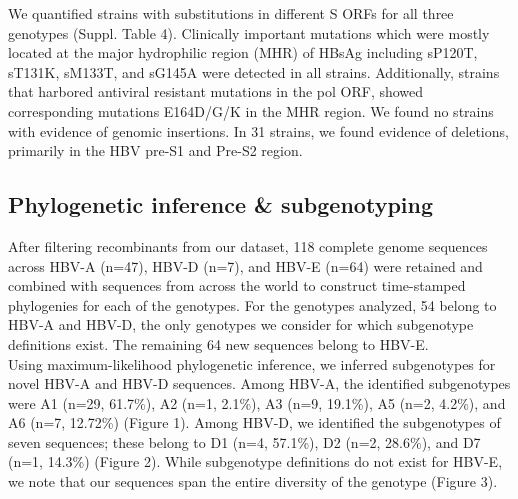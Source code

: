 We quantified strains with substitutions in different S ORFs for all three genotypes (Suppl. Table 4). Clinically important mutations which were mostly located at the major hydrophilic region (MHR) of HBsAg including sP120T, sT131K, sM133T, and sG145A were detected in all strains. Additionally, strains that harbored antiviral resistant mutations in the pol ORF, showed corresponding mutations E164D/G/K in the MHR region. We found no strains with evidence of genomic insertions. In 31 strains, we found evidence of deletions, primarily in the HBV pre-S1 and Pre-S2 region.

\subsection{Phylogenetic inference \& subgenotyping}
After filtering recombinants from our dataset, 118 complete genome sequences across HBV-A (n=47), HBV-D (n=7), and HBV-E (n=64) were retained and combined with sequences from across the world to construct time-stamped phylogenies for each of the genotypes. For the genotypes analyzed, 54 belong to HBV-A and HBV-D, the only genotypes we consider for which subgenotype definitions exist. The remaining 64 new sequences belong to HBV-E.\\

Using maximum-likelihood phylogenetic inference, we inferred subgenotypes for novel HBV-A and HBV-D sequences. Among HBV-A, the identified subgenotypes were A1 (n=29, 61.7\%), A2 (n=1, 2.1\%), A3 (n=9, 19.1\%), A5 (n=2,  4.2\%), and A6 (n=7, 12.72\%) (Figure 1). Among HBV-D, we identified the subgenotypes of seven sequences; these belong to D1 (n=4, 57.1\%), D2 (n=2, 28.6\%), and D7 (n=1, 14.3\%) (Figure 2). While subgenotype definitions do not exist for HBV-E, we note that our sequences span the entire diversity of the genotype (Figure 3). 



